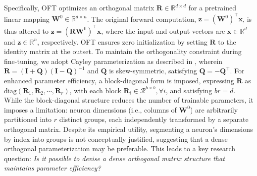 Specifically, OFT optimizes an orthogonal matrix $\bm{R}\in\mathbb{R}^{d\times d}$ for a pretrained linear mapping $\bm{W}^0\in\mathbb{R}^{d\times n}$. The original forward computation, $\bm{z}=(\bm{W}^0)^\top\bm{x}$, is thus altered to $\bm{z}=(\bm{R}\bm{W}^0)^\top\bm{x}$, where the input and output vectors are $\bm{x}\in\mathbb{R}^{d}$ and $\bm{z}\in\mathbb{R}^{n}$, respectively. OFT ensures zero initialization by setting $\bm{R}$ to the identity matrix at the outset. To maintain the orthogonality constraint during fine-tuning, we adopt Cayley parameterization as described in \cite{qiu2023controlling,liu2021orthogonal}, wherein $\bm{R}=(\bm{I}+\bm{Q})(\bm{I}-\bm{Q})^{-1}$ and $\bm{Q}$ is skew-symmetric, satisfying $\bm{Q}=-\bm{Q}^\top$. For enhanced parameter efficiency, a block-diagonal form is imposed, expressing $\bm{R}$ as $\text{diag}(\bm{R}_1,\bm{R}_2,\cdots,\bm{R}_r)$, with each block $\bm{R}_i\in\mathcal{R}^{b\times b},\forall i$, and satisfying $br=d$. While the block-diagonal structure reduces the number of trainable parameters, it imposes a limitation: neuron dimensions (i.e., columns of $\bm{W}^0$) are arbitrarily partitioned into $r$ distinct groups, each independently transformed by a separate orthogonal matrix. Despite its empirical utility, segmenting a neuron's dimensions by index into groups is not conceptually justified, suggesting that a dense orthogonal parameterization may be preferable. This leads to a key research question: \emph{Is it possible to devise a dense orthogonal matrix structure that maintains parameter efficiency?}

